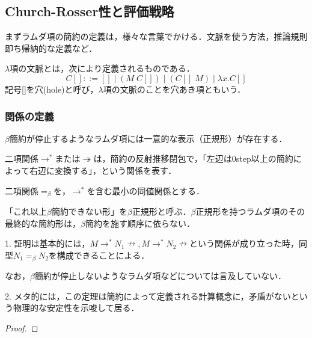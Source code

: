 \documentclass[uplatex, dvipdfmx]{jsreport}
\begin{document}
\subsection{Church-Rosser性と評価戦略}
まずラムダ項の簡約の定義は，様々な言葉でかける．文脈を使う方法，推論規則即ち帰納的な定義など．

\begin{definition}[Context]
    $\lambda$項の文脈とは，次により定義されるものである．
    \[ C[]::=[]\mid (M\;C[])\mid (C[]\;M)\mid\lambda x.C[] \]
    記号[]を穴(hole)と呼び，$\lambda$項の文脈のことを穴あき項ともいう．
\end{definition}

\subsubsection*{関係の定義}
$\beta$簡約が停止するようなラムダ項には一意的な表示（正規形）が存在する．

\begin{definition}
    二項関係$\to^*$または$\twoheadrightarrow$は，簡約の反射推移閉包で，「左辺は0step以上の簡約によって右辺に変換する」，という関係を表す．
\end{definition}

\begin{definition}[$\beta$等価]
    二項関係$=_\beta$を，$\to^*$を含む最小の同値関係とする．
\end{definition}

\begin{theorem}
    「これ以上$\beta$簡約できない形」を$\beta$正規形と呼ぶ．$\beta$正規形を持つラムダ項のその最終的な簡約形は，$\beta$簡約を施す順序に依らない．
    \begin{center}
    \end{center}
\end{theorem}
\begin{remark}
    1. 証明は基本的には，$M\to^* N_1\nrightarrow, M\to^*N_2\nrightarrow$という関係が成り立った時，同型$N_1=_\beta N_2$を構成できることによる．

    なお，$\beta$簡約が停止しないようなラムダ項などについては言及していない．

    2. メタ的には，この定理は簡約によって定義される計算概念に，矛盾がないという物理的な安定性を示唆して居る．
\end{remark}
\begin{proof}
    
\end{proof}
\end{document}
